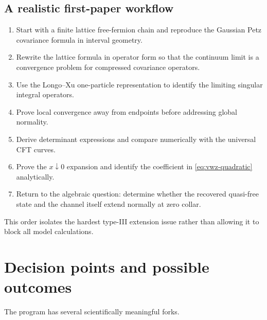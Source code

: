 \documentclass[11pt]{article}
\theoremstyle{accenttheorem}
\theoremstyle{definition}
\newcommand{\1}{\mathbf{1}}
\begin{document}
\subsection{A realistic first-paper workflow}

\begin{enumerate}
\item Start with a finite lattice free-fermion chain and reproduce the Gaussian Petz covariance formula in interval geometry.
\item Rewrite the lattice formula in operator form so that the continuum limit is a convergence problem for compressed covariance operators.
\item Use the Longo--Xu one-particle representation to identify the limiting singular integral operators.
\item Prove local convergence away from endpoints before addressing global normality.
\item Derive determinant expressions and compare numerically with the universal CFT curves.
\item Prove the \(x\downarrow0\) expansion and identify the coefficient in \eqref{eq:vwz-quadratic} analytically.
\item Return to the algebraic question: determine whether the recovered quasi-free state and the channel itself extend normally at zero collar.
\end{enumerate}

This order isolates the hardest type-III extension issue rather than allowing it to block all model calculations.

\section{Decision points and possible outcomes}

The program has several scientifically meaningful forks.
\end{document}
